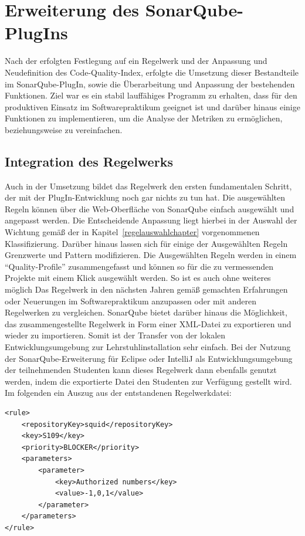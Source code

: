 \documentclass[da,ngerman]{stthesis}
\begin{document}
	\chapter{Erweiterung des SonarQube-PlugIns}
		Nach der erfolgten Festlegung auf ein Regelwerk und der Anpassung und Neudefinition des Code-Quality-Index, erfolgte die Umsetzung dieser Bestandteile im SonarQube-PlugIn, sowie die Überarbeitung und Anpassung der bestehenden Funktionen. Ziel war es ein stabil lauffähiges Programm zu erhalten, dass für den produktiven Einsatz im Softwarepraktikum geeignet ist und darüber hinaus einige Funktionen zu implementieren, um die Analyse der Metriken zu ermöglichen, beziehungsweise zu  vereinfachen. 
		\section{Integration des Regelwerks}
			Auch in der Umsetzung bildet das Regelwerk den ersten fundamentalen Schritt, der mit der PlugIn-Entwicklung noch gar nichts zu tun hat. Die ausgewählten Regeln können über die Web-Oberfläche von SonarQube einfach ausgewählt und angepasst werden. Die Entscheidende Anpassung liegt hierbei in der Auswahl der Wichtung gemäß der in Kapitel~\ref{regelauswahlchapter} vorgenommenen Klassifizierung. Darüber hinaus lassen sich für einige der Ausgewählten Regeln Grenzwerte und Pattern modifizieren. Die Ausgewählten Regeln werden in einem "`Quality-Profile"' zusammengefasst und können so für die zu vermessenden Projekte mit einem Klick ausgewählt werden. So ist es auch ohne weiteres möglich Das Regelwerk in den nächsten Jahren gemäß gemachten Erfahrungen oder Neuerungen im Softwarepraktikum anzupassen oder mit anderen Regelwerken zu vergleichen. \newline
			SonarQube bietet darüber hinaus die Möglichkeit, das zusammengestellte Regelwerk in Form einer XML-Datei zu exportieren und wieder zu importieren. Somit ist der Transfer von der lokalen Entwicklungsumgebung zur Lehrstuhlinstallation sehr einfach. Bei der Nutzung der SonarQube-Erweiterung für Eclipse oder IntelliJ als Entwicklungsumgebung der teilnehmenden Studenten kann dieses Regelwerk dann ebenfalls genutzt werden, indem die exportierte Datei den Studenten zur Verfügung gestellt wird. Im folgenden ein Auszug aus der entstandenen Regelwerkdatei:
			\lstset{language=XML}
			\begin{lstlisting}
<rule>
    <repositoryKey>squid</repositoryKey>
    <key>S109</key>
    <priority>BLOCKER</priority>
    <parameters>
        <parameter>
            <key>Authorized numbers</key>
            <value>-1,0,1</value>
        </parameter>
    </parameters>
</rule>
			\end{lstlisting} 
\end{document}
